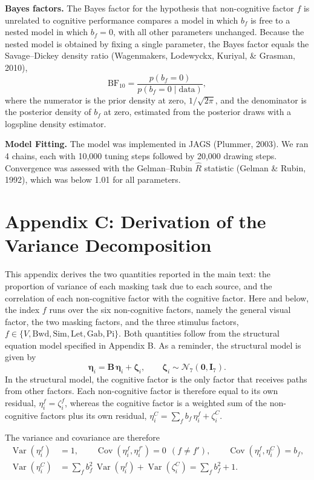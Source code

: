 \documentclass[
  ,man]{apa6}
\begin{document}
\textbf{Bayes factors.} The Bayes factor for the hypothesis that non-cognitive factor \(f\) is unrelated to cognitive performance compares a model in which \(b_f\) is free to a nested model in which \(b_f = 0\), with all other parameters unchanged. Because the nested model is obtained by fixing a single parameter, the Bayes factor equals the Savage--Dickey density ratio (Wagenmakers, Lodewyckx, Kuriyal, \& Grasman, 2010),
\[
\text{BF}_{10} = \frac{p(b_f = 0)}{p(b_f = 0 \mid \text{data})},
\]
where the numerator is the prior density at zero, \(1/\sqrt{2\pi}\), and the denominator is the posterior density of \(b_f\) at zero, estimated from the posterior draws with a logspline density estimator.

\textbf{Model Fitting.} The model was implemented in JAGS (Plummer, 2003). We ran 4 chains, each with 10,000 tuning steps followed by 20,000 drawing steps. Convergence was assessed with the Gelman--Rubin \(\hat{R}\) statistic (Gelman \& Rubin, 1992), which was below 1.01 for all parameters.

\section{Appendix C: Derivation of the Variance Decomposition}\label{appendix-c-derivation-of-the-variance-decomposition}

This appendix derives the two quantities reported in the main text: the proportion of variance of each masking task due to each source, and the correlation of each non-cognitive factor with the cognitive factor. Here and below, the index \(f\) runs over the six non-cognitive factors, namely the general visual factor, the two masking factors, and the three stimulus factors, \(f \in \{V, \text{Bwd}, \text{Sim}, \text{Let}, \text{Gab}, \text{Pi}\}\). Both quantities follow from the structural equation model specified in Appendix B. As a reminder, the structural model is given by
\[
\boldsymbol{\eta}_i = \mathbf{B}\,\boldsymbol{\eta}_i + \boldsymbol{\zeta}_i, \qquad \boldsymbol{\zeta}_i \sim \mathcal{N}_{7}\!\left(\mathbf{0}, \mathbf{I}_7\right).
\]
In the structural model, the cognitive factor is the only factor that receives paths from other factors. Each non-cognitive factor is therefore equal to its own residual, \(\eta_i^{f} = \zeta_i^{f}\), whereas the cognitive factor is a weighted sum of the non-cognitive factors plus its own residual, \(\eta_i^{C} = \sum_f b_f\,\eta_i^{f} + \zeta_i^{C}\).

The variance and covariance are therefore
\[
\begin{aligned}
\operatorname{Var}\!\left(\eta_i^{f}\right) &= 1, \qquad
\operatorname{Cov}\!\left(\eta_i^{f}, \eta_i^{f'}\right) = 0 \ \ (f \neq f'), \qquad
\operatorname{Cov}\!\left(\eta_i^{f}, \eta_i^{C}\right) = b_f, \\
\operatorname{Var}\!\left(\eta_i^{C}\right) &= \sum_f b_f^2\,\operatorname{Var}\!\left(\eta_i^{f}\right) + \operatorname{Var}\!\left(\zeta_i^{C}\right) = \sum_f b_f^2 + 1.
\end{aligned}
\]
\end{document}
